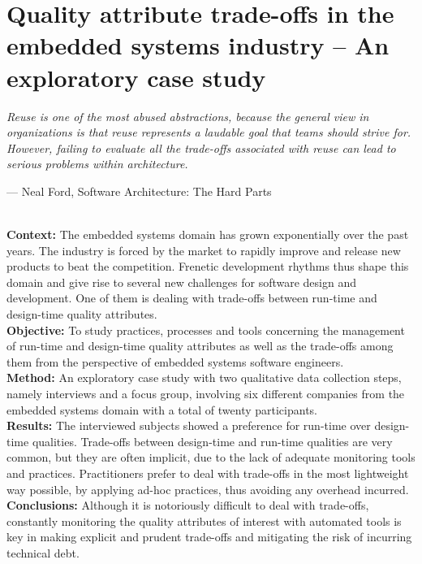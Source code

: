 \setlength{\headheight}{1.2cm}
\renewcommand{\publ}{\flushleft\footnotesize{Based on:\\[0.1cm]
		\textit{D. Sas, P. Avgeriou, Quality attribute trade-offs in the embedded systems industry: an exploratory case study. Software Quality Journal 28, 505-534 (2020). https://doi.org/10.1007/s11219-019-09478-x} \\[0.1cm]
}}

\chapter{Quality attribute trade-offs in the embedded systems industry -- An exploratory case study}
\label{chap:7}
\epigraph{\emph{Reuse is one of the most abused abstractions, because the general view in organizations is that reuse represents a laudable goal that teams should strive for. However, failing to evaluate all the trade-offs associated with reuse can lead to serious problems within architecture.}}{--- Neal Ford, Software Architecture: The Hard Parts}

\begin{Abstract}
    \textbf{\\Context: } The embedded systems domain has grown exponentially over the past years. The industry is forced by the market to rapidly improve and release new products to beat the competition. Frenetic development rhythms thus shape this domain and give rise to several new challenges for software design and development. One of them is dealing with trade-offs between run-time and design-time quality attributes.
    \\\textbf{Objective: } To study practices, processes and tools concerning the management of run-time and design-time quality attributes as well as the trade-offs among them from the perspective of embedded systems software engineers.
    \\\textbf{Method: } An exploratory case study with two qualitative data collection steps, namely interviews and a focus group, involving six different companies from the embedded systems domain with a total of twenty participants.
    \\\textbf{Results: } The interviewed subjects showed a preference for run-time over design-time qualities. Trade-offs between design-time and run-time qualities are very common, but they are often implicit, due to the lack of adequate monitoring tools and practices.
    Practitioners prefer to deal with trade-offs in the most lightweight way possible, by applying ad-hoc practices, thus avoiding any overhead incurred.
    \\\textbf{Conclusions: }
    Although it is notoriously difficult to deal with trade-offs, constantly monitoring the quality attributes of interest with automated tools is key in making explicit and prudent trade-offs and mitigating the risk of incurring technical debt.
\end{Abstract}

